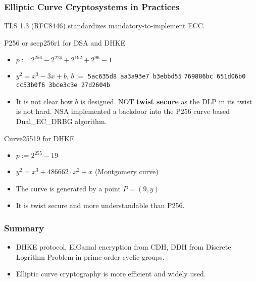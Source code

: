\begin{frame}[fragile]\frametitle{Elliptic Curve Cryptosystems in Practices}
TLS 1.3 (RFC8446) standardizes mandatory-to-implement ECC.
\begin{exampleblock}{P256 or secp256r1 for DSA and DHKE}
\begin{itemize}
\item $p := 2^{256}- 2^{224}+2^{192}+2^{96}-1$
\item $y^2 = x^3 - 3x +b$, $b := $ \verb|5ac635d8 aa3a93e7 b3ebbd55| \verb|769886bc 651d06b0 cc53b0f6 3bce3c3e 27d2604b|
\item It is not clear how $b$ is designed. NOT \textbf{twist secure} as the DLP in its twist is not hard.
NSA implemented a backdoor into the P256 curve based Dual\_EC\_DRBG algorithm.
\end{itemize}
\end{exampleblock}
\begin{exampleblock}{Curve25519 for DHKE}
    \begin{itemize}
    \item $p := 2^{255} - 19$
    \item $y^2 = x^3 + 486662\cdot x^2 +x$  (Montgomery curve)
    \item The curve is generated by a point $P = (9, y)$
    \item It is twist secure and more understandable than P256.
    \end{itemize}
    \end{exampleblock}
\end{frame}
\begin{frame}\frametitle{Summary}
\begin{itemize}
\item DHKE protocol, ElGamal encryption from CDH, DDH from Discrete Logrithm Problem in prime-order cyclic groups.
\item Elliptic curve cryptography is more efficient and widely used.
\end{itemize}
\end{frame}

